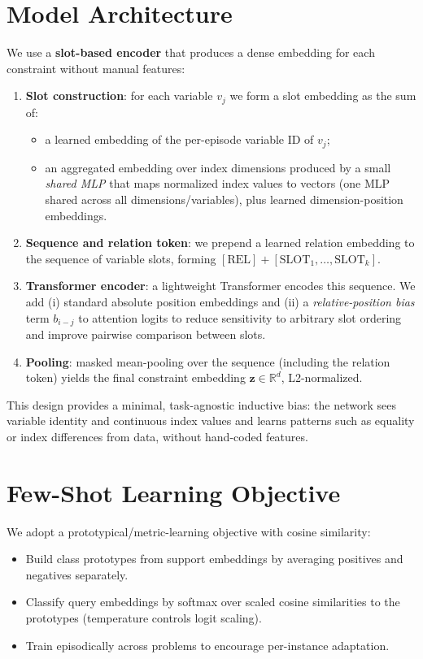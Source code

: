 \documentclass[11pt]{article}
\begin{document}
\section{Model Architecture}
We use a \textbf{slot-based encoder} that produces a dense embedding for each constraint without manual features:
\begin{enumerate}[noitemsep]
  \item \textbf{Slot construction}: for each variable $v_j$ we form a slot embedding as the sum of:
  \begin{itemize}[noitemsep]
    \item a learned embedding of the per-episode variable ID of $v_j$;
    \item an aggregated embedding over index dimensions produced by a small \emph{shared MLP} that maps normalized index values to vectors (one MLP shared across all dimensions/variables), plus learned dimension-position embeddings.
  \end{itemize}
  \item \textbf{Sequence and relation token}: we prepend a learned relation embedding to the sequence of variable slots, forming $[\mathrm{REL}] + [\mathrm{SLOT}_1,\dots,\mathrm{SLOT}_k]$.
  \item \textbf{Transformer encoder}: a lightweight Transformer encodes this sequence. We add (i) standard absolute position embeddings and (ii) a \emph{relative-position bias} term $b_{i-j}$ to attention logits to reduce sensitivity to arbitrary slot ordering and improve pairwise comparison between slots.
  \item \textbf{Pooling}: masked mean-pooling over the sequence (including the relation token) yields the final constraint embedding $\mathbf{z}\in\mathbb{R}^d$, L2-normalized.
\end{enumerate}

This design provides a minimal, task-agnostic inductive bias: the network sees variable identity and continuous index values and learns patterns such as equality or index differences from data, without hand-coded features.

\section{Few-Shot Learning Objective}
We adopt a prototypical/metric-learning objective with cosine similarity:
\begin{itemize}[noitemsep]
  \item Build class prototypes from support embeddings by averaging positives and negatives separately.
  \item Classify query embeddings by softmax over scaled cosine similarities to the prototypes (temperature controls logit scaling).
  \item Train episodically across problems to encourage per-instance adaptation.
\end{itemize}
\end{document}
